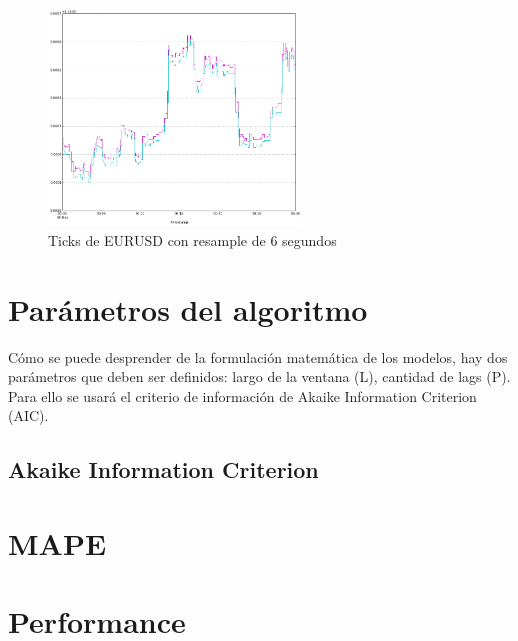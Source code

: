 \begin{figure}[h!t]
    \begin{center}
        \includegraphics[width=0.6\textwidth]{images/eurusd_6s}
        \caption{Ticks de EURUSD con resample de 6 segundos}
        \label{fig:eurusd_r6s}
    \end{center}
\end{figure}

\section{Parámetros del algoritmo}
Cómo se puede desprender de la formulación matemática de los modelos, hay dos parámetros que deben ser definidos: largo de la ventana (L), cantidad de lags (P). Para ello se usará el criterio de información de Akaike Information Criterion (AIC).

\subsection{Akaike Information Criterion}


\section{MAPE}

\section{Performance}

